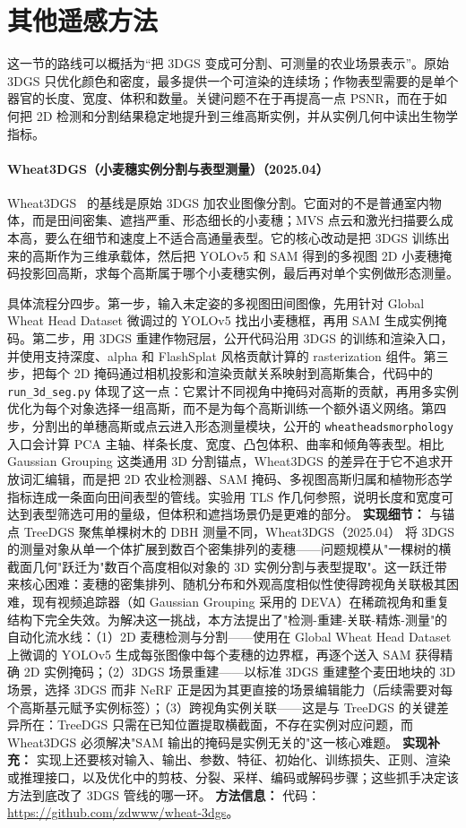 \section{其他遥感方法}

这一节的路线可以概括为“把 3DGS 变成可分割、可测量的农业场景表示”。原始 3DGS 只优化颜色和密度，最多提供一个可渲染的连续场；作物表型需要的是单个器官的长度、宽度、体积和数量。关键问题不在于再提高一点 PSNR，而在于如何把 2D 检测和分割结果稳定地提升到三维高斯实例，并从实例几何中读出生物学指标。
\paragraph{Wheat3DGS（小麦穗实例分割与表型测量）（2025.04）}
Wheat3DGS~\cite{2504_06978} 的基线是原始 3DGS 加农业图像分割。它面对的不是普通室内物体，而是田间密集、遮挡严重、形态细长的小麦穗；MVS 点云和激光扫描要么成本高，要么在细节和速度上不适合高通量表型。它的核心改动是把 3DGS 训练出来的高斯作为三维承载体，然后把 YOLOv5 和 SAM 得到的多视图 2D 小麦穗掩码投影回高斯，求每个高斯属于哪个小麦穗实例，最后再对单个实例做形态测量。

具体流程分四步。第一步，输入未定姿的多视图田间图像，先用针对 Global Wheat Head Dataset 微调过的 YOLOv5 找出小麦穗框，再用 SAM 生成实例掩码。第二步，用 3DGS 重建作物冠层，公开代码沿用 3DGS 的训练和渲染入口，并使用支持深度、alpha 和 FlashSplat 风格贡献计算的 rasterization 组件。第三步，把每个 2D 掩码通过相机投影和渲染贡献关系映射到高斯集合，代码中的 \texttt{run\_3d\_seg.py} 体现了这一点：它累计不同视角中掩码对高斯的贡献，再用多实例优化为每个对象选择一组高斯，而不是为每个高斯训练一个额外语义网络。第四步，分割出的单穗高斯或点云进入形态测量模块，公开的 \texttt{wheatheadsmorphology} 入口会计算 PCA 主轴、样条长度、宽度、凸包体积、曲率和倾角等表型。相比 Gaussian Grouping 这类通用 3D 分割锚点，Wheat3DGS 的差异在于它不追求开放词汇编辑，而是把 2D 农业检测器、SAM 掩码、多视图高斯归属和植物形态学指标连成一条面向田间表型的管线。实验用 TLS 作几何参照，说明长度和宽度可达到表型筛选可用的量级，但体积和遮挡场景仍是更难的部分。
\textbf{实现细节：} 与锚点 TreeDGS 聚焦单棵树木的 DBH 测量不同，Wheat3DGS（2025.04） 将 3DGS 的测量对象从单一个体扩展到数百个密集排列的麦穗——问题规模从"一棵树的横截面几何"跃迁为"数百个高度相似对象的 3D 实例分割与表型提取"。这一跃迁带来核心困难：麦穗的密集排列、随机分布和外观高度相似性使得跨视角关联极其困难，现有视频追踪器（如 Gaussian Grouping 采用的 DEVA）在稀疏视角和重复结构下完全失效。为解决这一挑战，本方法提出了"检测-重建-关联-精炼-测量"的自动化流水线：（1）2D 麦穗检测与分割——使用在 Global Wheat Head Dataset 上微调的 YOLOv5 生成每张图像中每个麦穗的边界框，再逐个送入 SAM 获得精确 2D 实例掩码；（2）3DGS 场景重建——以标准 3DGS 重建整个麦田地块的 3D 场景，选择 3DGS 而非 NeRF 正是因为其更直接的场景编辑能力（后续需要对每个高斯基元赋予实例标签）；（3）跨视角实例关联——这是与 TreeDGS 的关键差异所在：TreeDGS 只需在已知位置提取横截面，不存在实例对应问题，而 Wheat3DGS 必须解决"SAM 输出的掩码是实例无关的"这一核心难题。
\textbf{实现补充：} 实现上还要核对输入、输出、参数、特征、初始化、训练损失、正则、渲染或推理接口，以及优化中的剪枝、分裂、采样、编码或解码步骤；这些抓手决定该方法到底改了 3DGS 管线的哪一环。
\textbf{方法信息：} 代码：\url{https://github.com/zdwww/wheat-3dgs}。
